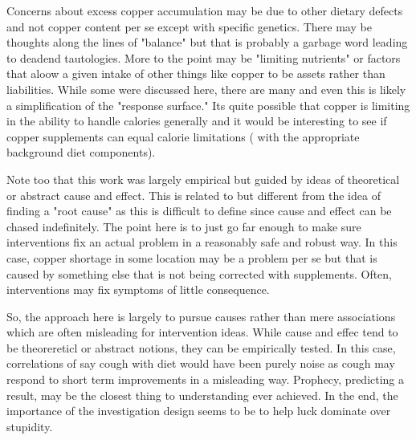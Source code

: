 Concerns about excess copper accumulation may be due to other dietary defects
and not copper content per se except with specific genetics.  
There may be thoughts along the
lines of "balance" but that is probably a garbage word leading
to deadend tautologies. More to the point may be "limiting nutrients" or
factors that aloow a given intake of other things like copper
to be assets rather than liabilities. While some were discussed here,
there are many and even this is likely a simplification of 
the "response surface." Its quite possible that copper is limiting
in the ability to handle calories generally and it would be interesting
to see if copper supplements can equal calorie limitations ( with the
appropriate background diet components).  


Note too that this work was largely empirical but guided
by ideas of theoretical or abstract cause and effect. 
This is related to but different from the idea of finding a "root
cause" as this is difficult to define since cause and effect can be
chased indefinitely.  The point here is to just go far enough to
make sure interventions fix an actual problem in a reasonably
safe and robust way. In this case, copper shortage in some location may
be a problem per se but that is caused by something else that is not
being corrected with supplements. 
Often, interventions may fix symptoms of little consequence.
 

So, the approach here is largely to pursue causes rather than
mere associations which are often misleading for intervention
ideas.   While cause and effec tend to be theorereticl or abstract
notions, they can be empirically tested.  
In this case, correlations of say cough with diet would
have been purely noise as cough may respond to short term
improvements in a misleading way.  Prophecy, predicting
a result, may be the closest thing to understanding ever achieved.
In the end, the importance of the investigation design seems to
be to help luck dominate over stupidity. 


